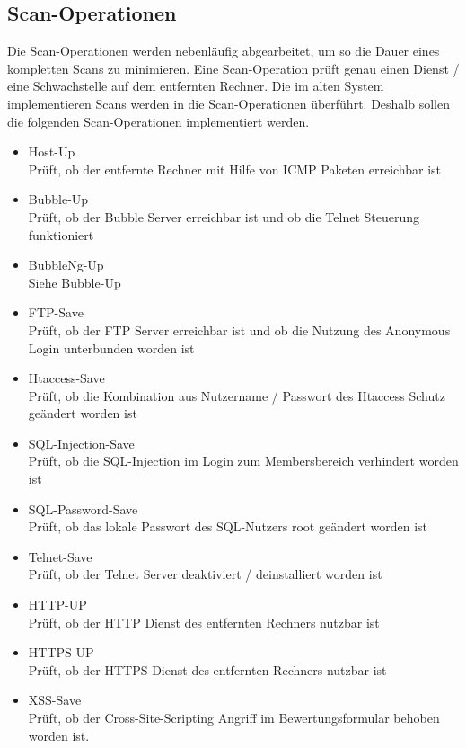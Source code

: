 \subsection{Scan-Operationen}

Die Scan-Operationen werden nebenläufig abgearbeitet, um so die Dauer eines kompletten Scans zu minimieren. Eine Scan-Operation prüft genau einen Dienst / eine Schwachstelle auf dem entfernten Rechner. Die im alten System implementieren Scans werden in die Scan-Operationen überführt. Deshalb sollen die folgenden Scan-Operationen implementiert werden.

\begin{itemize}
	\item Host-Up \\
	Prüft, ob der entfernte Rechner mit Hilfe von ICMP Paketen erreichbar ist
	\item Bubble-Up \\
	Prüft, ob der Bubble Server erreichbar ist und ob die Telnet Steuerung funktioniert
	\item BubbleNg-Up\\
	Siehe Bubble-Up
	\item FTP-Save\\
	Prüft, ob der FTP Server erreichbar ist und ob die Nutzung des Anonymous Login unterbunden worden ist
	\item Htaccess-Save\\
	Prüft, ob die Kombination aus Nutzername / Passwort des Htaccess Schutz geändert worden ist
	\item SQL-Injection-Save\\
	Prüft, ob die SQL-Injection im Login zum Membersbereich verhindert worden ist
	\item SQL-Password-Save\\
	Prüft, ob das lokale Passwort des SQL-Nutzers root geändert worden ist
	\item Telnet-Save\\
	Prüft, ob der Telnet Server deaktiviert / deinstalliert worden ist
	\item HTTP-UP\\
	Prüft, ob der HTTP Dienst des entfernten Rechners nutzbar ist
	\item HTTPS-UP\\
	Prüft, ob der HTTPS Dienst des entfernten Rechners nutzbar ist
	\item XSS-Save\\
	Prüft, ob der Cross-Site-Scripting Angriff im Bewertungsformular behoben worden ist.
\end{itemize}

